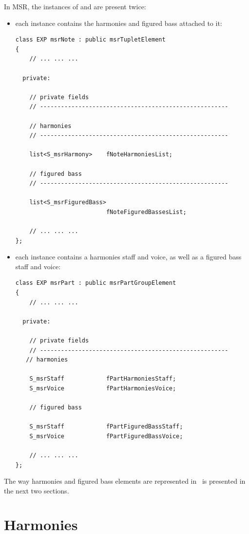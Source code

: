 In MSR, the instances of  and  are present twice:
\begin{itemize}
\item each  instance contains the harmonies and figured bass attached to it:
\begin{lstlisting}[language=CPlusPlus]
class EXP msrNote : public msrTupletElement
{
	// ... ... ...

  private:

    // private fields
    // ------------------------------------------------------

    // harmonies
    // ------------------------------------------------------

    list<S_msrHarmony>    fNoteHarmoniesList;

    // figured bass
    // ------------------------------------------------------

    list<S_msrFiguredBass>
                          fNoteFiguredBassesList;

	// ... ... ...
};
\end{lstlisting}

\item each  instance contains a harmonies staff and voice, as well as a figured bass staff and voice:
\begin{lstlisting}[language=CPlusPlus]
class EXP msrPart : public msrPartGroupElement
{
	// ... ... ...

  private:

    // private fields
    // ------------------------------------------------------
   // harmonies

    S_msrStaff            fPartHarmoniesStaff;
    S_msrVoice            fPartHarmoniesVoice;

    // figured bass

    S_msrStaff            fPartFiguredBassStaff;
    S_msrVoice            fPartFiguredBassVoice;

	// ... ... ...
};
\end{lstlisting}
\end{itemize}

The way harmonies and figured bass elements are represented in \mf\ is presented in the next two sections.


\section{Harmonies}\label{Harmonies}

